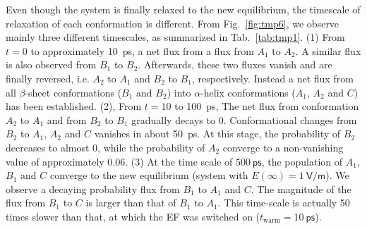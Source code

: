 \documentclass[a4paper,preprint,unsortedaddress,onecolumn]{revtex4-1}
\begin{document}
Even though the system is finally relaxed to the new equilibrium,
the timescale of relaxation of each conformation is different. 
From Fig.~\ref{fig:tmp6}, we observe mainly
three different timescales, as summarized in Tab.~\ref{tab:tmp1}.
(1) From
$t=0$ to approximately 10~\textsf{ps}, a net flux from 
a flux from $A_1$ to $A_2$.
A similar flux is also observed from $B_1$ to $B_2$.
Afterwards, these two fluxes vanish and are finally reversed,
i.e. $A_2$ to $A_1$ and $B_2$ to $B_1$, respectively.
Instead a net flux from all $\beta$-sheet conformations
($B_1$ and $B_2$) into $\alpha$-helix conformations ($A_1$, $A_2$ and
$C$) has been established.
(2), From $t=10$ to
100~\textsf{ps},
The net flux from  conformation $A_2$ to $A_1$ and from $B_2$ to $B_1$
gradually decays to 0. Conformational changes from $B_2$ to $A_1$, $A_2$ and $C$
vanishes in about 50~ps.
At this stage, the probability of $B_2$ decreases to almost 0,
while the probability of $A_2$
converge to a non-vanishing value of approximately 0.06.
(3) At the time scale of $
500~\textsf{ps}$, the population of $A_1$, $B_1$ and $C$ converge to
the new equilibrium (system with $E(\infty) = 1~\textsf{V/m}$).
We observe a decaying probability flux from $B_1$ 
to $A_1$ and $C$.
The magnitude of the flux from $B_1$ to  $C$ is larger than that of $B_1$ to  $A_1$.
This time-scale is actually 50 times slower than that, at which
the EF was switched on ($t_{\textrm{warm}} = 10~\textsf{ps}$).
\end{document}
